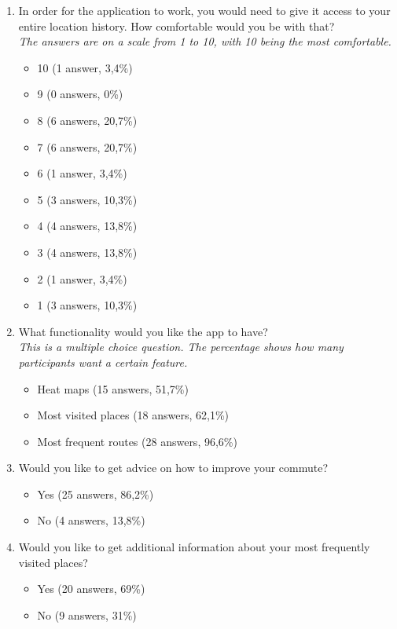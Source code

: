 \documentclass[12p]{article}
\begin{document}
\begin{enumerate}
    \item In order for the application to work, you would need to give it access to your entire location history. How comfortable would you be with that?
    \\\textit{The answers are on a scale from 1 to 10, with 10 being the most comfortable.}
    \begin{itemize}
        \item 10 (1 answer, 3,4\%)
        \item 9 (0 answers, 0\%)
        \item 8 (6 answers, 20,7\%)
        \item 7 (6 answers, 20,7\%)
        \item 6 (1 answer, 3,4\%)
        \item 5 (3 answers, 10,3\%)
        \item 4 (4 answers, 13,8\%)
        \item 3 (4 answers, 13,8\%)
        \item 2 (1 answer, 3,4\%)
        \item 1 (3 answers, 10,3\%)
    \end{itemize}

    \item What functionality would you like the app to have?
    \\\textit{This is a multiple choice question. The percentage shows how many participants want a certain feature.}
    \begin{itemize}
        \item Heat maps (15 answers, 51,7\%)
        \item Most visited places (18 answers, 62,1\%)
        \item Most frequent routes (28 answers, 96,6\%)
    \end{itemize}
    
    \item Would you like to get advice on how to improve your commute?
    \begin{itemize}
        \item Yes (25 answers, 86,2\%)
        \item No (4 answers, 13,8\%)
    \end{itemize}
    
    \item Would you like to get additional information about your most frequently visited places?
    \begin{itemize}
        \item Yes (20 answers, 69\%)
        \item No (9 answers, 31\%)
    \end{itemize}
\end{enumerate}

		
\end{document}
